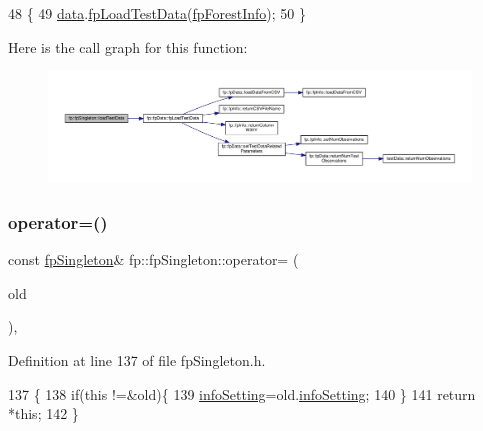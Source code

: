 \begin{DoxyCode}
48                                       \{
49                 \hyperlink{classfp_1_1fpSingleton_a2fa16ac6a0f66641749032eeee61b8e9}{data}.\hyperlink{classfp_1_1fpData_a4b527bc84762c4708992b7fdce3d0602}{fpLoadTestData}(\hyperlink{classfp_1_1fpSingleton_a85965009befa72a749ae498fa5b6ccfa}{fpForestInfo});
50             \}
\end{DoxyCode}
Here is the call graph for this function\+:\nopagebreak
\begin{figure}[H]
\begin{center}
\leavevmode
\includegraphics[width=350pt]{classfp_1_1fpSingleton_aea7c3b65ded387322d7d5ce48ab96215_cgraph}
\end{center}
\end{figure}
\mbox{\label{classfp_1_1fpSingleton_a342b8b19aa98af5b2f56210cf0b164b0}} 
\subsubsection{\texorpdfstring{operator=()}{operator=()}}
{\footnotesize\ttfamily const \hyperlink{classfp_1_1fpSingleton}{fp\+Singleton}\& fp\+::fp\+Singleton\+::operator= (\begin{DoxyParamCaption}\item[{const \hyperlink{classfp_1_1fpSingleton}{fp\+Singleton} \&}]{old }\end{DoxyParamCaption})\hspace{0.3cm}{\ttfamily [inline]}, {\ttfamily [private]}}



Definition at line 137 of file fp\+Singleton.\+h.


\begin{DoxyCode}
137                                                                 \{
138                 \textcolor{keywordflow}{if}(\textcolor{keyword}{this} !=&old)\{
139                     \hyperlink{classfp_1_1fpSingleton_a0e2c02e7e7f730f59e5c1f10005d581c}{infoSetting}=old.\hyperlink{classfp_1_1fpSingleton_a0e2c02e7e7f730f59e5c1f10005d581c}{infoSetting};
140                 \}
141                 \textcolor{keywordflow}{return} *\textcolor{keyword}{this};
142             \}
\end{DoxyCode}
\mbox{\label{classfp_1_1fpSingleton_ab789c4e4bfb3248711a5857015008f8d}} 
